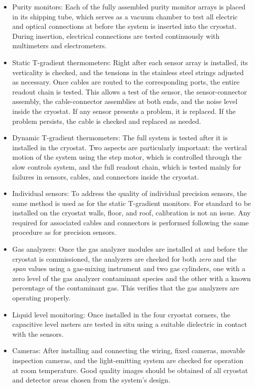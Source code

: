 \begin{itemize}
\item {Purity monitors}: Each of the fully assembled purity monitor arrays is placed in its shipping tube, which serves as a vacuum chamber to test all electric and optical connections at  before the system is inserted into the cryostat. During insertion, electrical connections are tested continuously with multimeters and electrometers.

\item {Static T-gradient thermometers}: Right after each sensor array is installed, its verticality 
is checked, and the tensions in the stainless steel strings adjusted as necessary. Once cables are routed to the corresponding  ports, the entire readout chain is tested. This allows a test of the sensor, the sensor-connector assembly, the cable-connector assemblies at both ends, and the noise level inside the cryostat.
If any sensor presents a problem, it is replaced. If the problem persists, the cable is checked and replaced as needed.

\item {Dynamic T-gradient thermometers}: The full system is tested after it is installed in the cryostat. Two aspects are particularly important: the vertical motion of the system using the step motor, which is controlled through the slow controls system, and the full readout chain, which is tested mainly for failures in sensors, cables, and connectors inside the cryostat. 

\item {Individual sensors}: To address the quality of individual precision sensors, the same method is used as for
the static T-gradient monitors. For standard  to be installed on the cryostat walls, floor, and roof, calibration is not an issue. Any  required for associated cables and connectors is performed following the same procedure as for precision sensors.

\item {Gas analyzers}: Once the gas analyzer modules are installed at  and before the cryostat is commissioned, the analyzers 
are checked for both \textit{zero} and the \textit{span} values using a gas-mixing instrument and two gas cylinders, one with a
zero level of the gas analyzer contaminant species and the other with a known percentage of the contaminant gas. This verifies that the gas analyzers are operating properly. 

\item {Liquid level monitoring}: Once installed in the four cryostat corners, the capacitive level meters are tested in situ 
using a suitable dielectric in contact with the sensors.

\item {Cameras}: After installing and connecting the wiring, fixed cameras, movable inspection cameras, and the light-emitting system are checked for operation at room temperature. Good quality images should be obtained of all cryostat and detector areas chosen from the system's design.  
\end{itemize}

